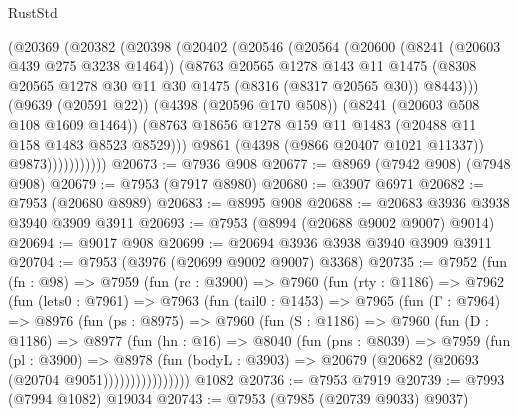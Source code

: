 \begin{lexlean}{RustStd}
\begin{coremodule}
                (@20369
                  (@20382
                    (@20398
                      (@20402
                        (@20546
                          (@20564
                            (@20600
                              (@8241 (@20603 @439 @275 @3238 @1464))
                              (@8763
                                @20565
                                @1278
                                @143
                                @11
                                @1475
                                (@8308
                                  @20565
                                  @1278
                                  @30
                                  @11
                                  @30
                                  @1475
                                  (@8316 (@8317 @20565 @30))
                                  @8443)))
                            (@9639 (@20591 @22))
                            (@4398 (@20596 @170 @508))
                            (@8241 (@20603 @508 @108 @1609 @1464))
                            (@8763 @18656 @1278 @159 @11 @1483 (@20488 @11 @158 @1483 @8523 @8529)))
                          @9861
                          (@4398 (@9866 @20407 @1021 @11337))
                          @9873)))))))))))
@20673 := @7936 @908
@20677 := @8969 (@7942 @908) (@7948 @908)
@20679 := @7953 (@7917 @8980)
@20680 := @3907 @6971
@20682 := @7953 (@20680 @8989)
@20683 := @8995 @908
@20688 := @20683 @3936 @3938 @3940 @3909 @3911
@20693 := @7953 (@8994 (@20688 @9002 @9007) @9014)
@20694 := @9017 @908
@20699 := @20694 @3936 @3938 @3940 @3909 @3911
@20704 := @7953 (@3976 (@20699 @9002 @9007) @3368)
@20735 := @7952
    (fun (fn : @98) =>
    @7959
      (fun (rc : @3900) =>
      @7960
        (fun (rty : @1186) =>
        @7962
          (fun (lets0 : @7961) =>
          @7963
            (fun (tail0 : @1453) =>
            @7965
              (fun (Γ : @7964) =>
              @8976
                (fun (ps : @8975) =>
                @7960
                  (fun (S : @1186) =>
                  @7960
                    (fun (D : @1186) =>
                    @8977
                      (fun (hn : @16) =>
                      @8040
                        (fun (pns : @8039) =>
                        @7959
                          (fun (pl : @3900) =>
                          @8978
                            (fun (bodyL : @3903) =>
                            @20679 (@20682 (@20693 (@20704 @9051))))))))))))))))
    @1082
@20736 := @7953 @7919
@20739 := @7993 (@7994 @1082) @19034
@20743 := @7953 (@7985 (@20739 @9033) @9037)

\end{coremodule}
\end{lexlean}
